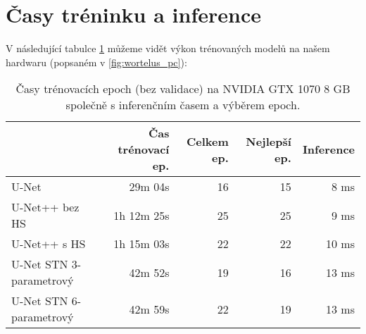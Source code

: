 \section{Časy tréninku a inference}
\label{sec:Chapter61}
V následující tabulce \ref{tab:models_performance} můžeme vidět výkon trénovaných modelů na našem hardwaru (popsaném v \ref{fig:wortelus_pc}):
\begin{table}[H]
    \centering
    \begin{tabular}{lrrrr}
        \toprule
         & Čas trénovací ep. & Celkem ep. & Nejlepší ep. & Inference \\
         \midrule
         U-Net & 29m 04s & 16 & 15 & 8 ms \\
         U-Net++ bez HS & 1h 12m 25s & 25 & 25 & 9 ms \\
         U-Net++ s HS & 1h 15m 03s & 22 & 22 & 10 ms \\
         U-Net STN 3-parametrový & 42m 52s & 19 & 16 & 13 ms \\
         U-Net STN 6-parametrový & 42m 59s & 22 & 19 & 13 ms \\
         \bottomrule
    \end{tabular}
    \caption[Statistiky trénovaných modelů]{Časy trénovacích epoch (bez validace) na NVIDIA GTX 1070 8 GB společně s inferenčním časem a výběrem epoch. }
    \label{tab:models_performance}
\end{table}

\endinput
